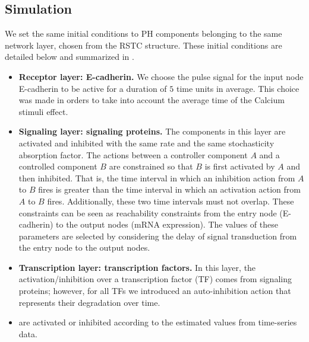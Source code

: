\subsection{Simulation}

We set the same initial conditions to PH components belonging to the same network layer, chosen from the RSTC structure.
These initial conditions are detailed below and summarized in .

\begin{itemize}
 \item \textbf{Receptor layer: E-cadherin.} We choose the  pulse signal for the input node E-cadherin to be active for a duration of $5$ time units in average. This 
 choice was made in orders to take into account the average time of the Calcium stimuli effect.
 \item \textbf{Signaling layer: signaling proteins.} The components in this layer are activated and inhibited with the same rate and the same stochasticity absorption factor. 
The actions between a controller component $A$ and a controlled component $B$ are constrained so that 
$B$ is first activated by $A$ and then inhibited.  That is, 
the time interval in which an inhibition action from $A$ to $B$ fires is greater than 
the time interval in which an activation action from $A$ to $B$ fires.
Additionally, these two time intervals must not overlap.
These constraints can be seen as 
reachability constraints from the entry  node (E-cadherin) to the output nodes (mRNA expression). The values of these parameters are selected by considering the delay of signal transduction from the entry
 node to the output nodes.
 \item \textbf{Transcription layer: transcription factors.} In this layer, the activation/inhibition over a transcription factor (TF) comes from signaling proteins; however, 
for all TFs we introduced an auto-inhibition action that represents their degradation over time. 
 \item {} are activated or inhibited according to the estimated values from time-series data.
\end{itemize}


